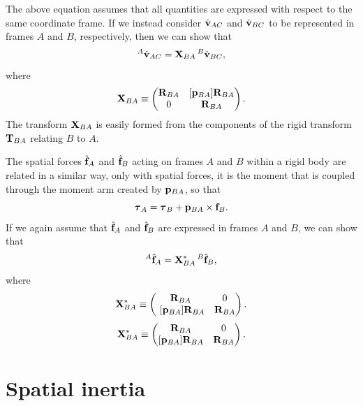 The above equation assumes that all quantities are expressed
with respect to the same coordinate frame.
If we instead consider $\hat{{\bf v}}_{AC}$ and $\hat{{\bf v}}_{BC}$ to be represented
in frames $A$ and $B$, respectively, then
we can show that
%
\begin{equation}
{}^A\hat{{\bf v}}_{AC} = {\bf X}_{BA} \, {}^B\hat{{\bf v}}_{BC},
\end{equation}
%
where
%
\begin{equation}
{\bf X}_{BA} \equiv
\left(\begin{matrix} {\bf R}_{BA} & [{\bf p}_{BA}] {\bf R}_{BA} \\ 0 & {\bf R}_{BA} \end{matrix}\right).
\label{XvelAB:eqn}
\end{equation}
%
The transform ${\bf X}_{BA}$ is easily formed from the components of the
rigid transform ${\bf T}_{BA}$ relating $B$ to $A$.

The spatial forces $\hat{{\bf f}}_A$ and $\hat{{\bf f}}_B$ acting on frames $A$ and
$B$ within a rigid body are related in a similar way, only with
spatial forces, it is the moment that is coupled through the moment
arm created by ${\bf p}_{BA}$, so that
%
\begin{equation*}
\boldsymbol\tau_{A} = \boldsymbol\tau_{B} + {\bf p}_{BA} \times {\bf f}_{B}.
\end{equation*}
%
If we again assume that $\hat{{\bf f}}_A$ and $\hat{{\bf f}}_B$
are expressed in frames $A$ and $B$, we can show that
%
\begin{equation}
{}^A\hat{{\bf f}}_A = {\bf X}^*_{BA} \, {}^B\hat{{\bf f}}_B,
\end{equation}
%
where
%
\iflatexml
\begin{equation}
{\bf X}^*_{BA} \equiv 
\left(\begin{matrix} {\bf R}_{BA} & 0 \\  ~[{\bf p}_{BA}]{\bf R}_{BA} & {\bf R}_{BA} \end{matrix}\right). 
\label{XforceAB:eqn}
\end{equation}
\else
\begin{equation}
\X^*_{BA} \equiv
\matl \R_{BA} & 0 \\  [\p_{BA}] \R_{BA} & \R_{BA} \matr.
\label{XforceAB:eqn}
\end{equation}
\fi


\section{Spatial inertia}
\label{SpatialInertia:sec}

